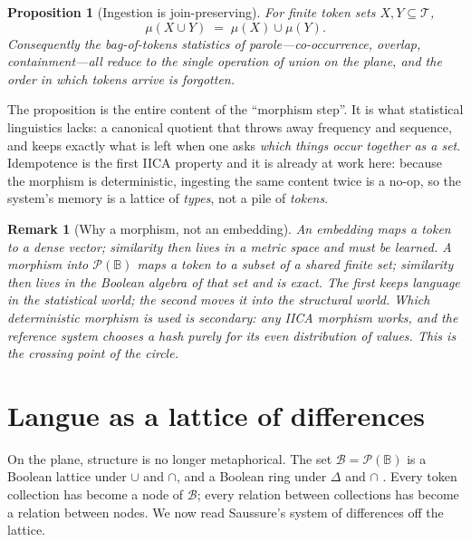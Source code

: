 \documentclass[11pt,a4paper]{article}
\newtheorem{proposition}[principle]{Proposition}
\newtheorem{remark}[principle]{Remark}
\theoremstyle{remark}
\newcommand{\Plane}{\ensuremath{\mathbb{B}}}            %
\newcommand{\Lat}{\ensuremath{\mathcal{B}}}              %
\newcommand{\Tok}{\ensuremath{\mathcal{T}}}              %
\newcommand{\xor}{\ensuremath{\Delta}}                   %
\newcommand{\Ing}{\ensuremath{\mu}}                      %
\begin{document}
\begin{proposition}[Ingestion is join-preserving]
For finite token sets $X, Y \subseteq \Tok$,
\[
  \Ing(X \cup Y) \;=\; \Ing(X) \cup \Ing(Y).
\]
Consequently the bag-of-tokens statistics of parole---co-occurrence, overlap,
containment---all reduce to the single operation of union on the plane, and the
order in which tokens arrive is forgotten.
\end{proposition}

The proposition is the entire content of the ``morphism step''. It is what
statistical linguistics lacks: a canonical quotient that throws away frequency
and sequence, and keeps exactly what is left when one asks \emph{which things
occur together as a set}. Idempotence is the first IICA property and it is
already at work here: because the morphism is deterministic, ingesting the same
content twice is a no-op, so the system's memory is a lattice of \emph{types},
not a pile of \emph{tokens}.

\begin{remark}[Why a morphism, not an embedding]
An embedding maps a token to a dense vector; similarity then lives in a metric
space and must be learned. A morphism into $\mathcal{P}(\Plane)$ maps a token
to a \emph{subset of a shared finite set}; similarity then lives in the Boolean
algebra of that set and is \emph{exact}. The first keeps language in the
statistical world; the second moves it into the structural world. \emph{Which}
deterministic morphism is used is secondary: any IICA morphism works, and the
reference system chooses a hash purely for its even distribution of values.
This is the crossing point of the circle.
\end{remark}

\section{Langue as a lattice of differences}
\label{sec:langue}

On the plane, structure is no longer metaphorical. The set $\Lat =
\mathcal{P}(\Plane)$ is a Boolean lattice under $\cup$ and $\cap$, and a
Boolean ring under $\xor$ and $\cap$ \cite{birkhoff1940}. Every token
collection has become a node of $\Lat$; every relation between collections has
become a relation between nodes. We now read Saussure's system of differences
off the lattice.
\end{document}
